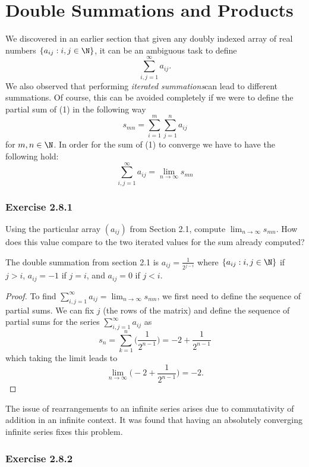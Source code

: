 


\section{Double Summations and Products}

We discovered in an earlier section that given any doubly indexed array of real numbers \( \{  a_{ij} : i,j \in \N  \}\), it can be an ambiguous task to define 
\[ \sum_{i,j = 1}^{\infty} a_{ij}. \tag{1}\]
We also observed that performing \textit{iterated summations}can lead to different summations. Of course, this can be avoided completely if we were to define the partial sum of (1) in the following way 
\[ s_{mn} =  \sum_{i=1}^{m} \sum_{j=1}^{n} a_{ij}\]
for \( m, n \in \N \). In order for the sum of (1) to converge we have to have the following hold:
\[ \sum_{i,j = 1 }^{\infty} a_{ij} = \lim_{n \to \infty} s_{mn}\]

\subsubsection{Exercise 2.8.1} Using the particular array \( (a_{ij})\) from Section 2.1, compute \( \lim_{n \to \infty} s_{mn}\). How does this value compare to the two iterated values for the sum already computed?  

The double summation from section 2.1 is \( a_{ij} = \frac{1}{2^{j-i}}\) where \( \{ a_{ij} : i, j \in \N  \}\) if \( j > i \), \( a_{ij} = -1 \) if \( j = i \), and \( a_{ij} = 0 \) if \( j < i \). 
\begin{proof}
    To find \( \sum_{i,j = 1}^{\infty} a_{ij} = \lim_{n \to \infty} s_{mn}\), we first need to define the sequence of partial sums. We can fix \( j \) (the rows of the matrix) and define the sequence of partial sums for the series \( \sum_{i,j = 1 }^{\infty} a_{ij}\) as 
    \[ s_n = \sum_{k=1}^{n} \Big( \frac{1}{2^{n-1}}\Big) = -2 + \frac{1}{2^{n-1}} \]
    which taking the limit leads to 
    \[ \lim_{n \to \infty} \Big( -2 + \frac{1}{2^{n-1}} \Big) = -2.\]

\end{proof}

The issue of rearrangements to an infinite series arises due to commutativity of addition in an infinite context. It was found that having an absolutely converging infinite series fixes this problem. 

\subsubsection{Exercise 2.8.2}


